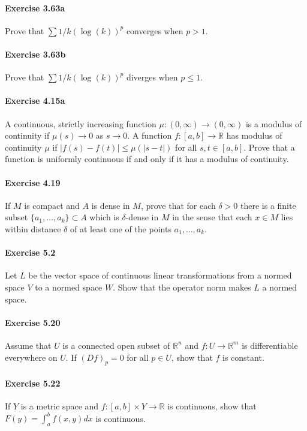 \documentclass{article}
\begin{document}
\paragraph{Exercise 3.63a} Prove that $\sum 1/k(\log(k))^p$ converges when $p > 1$.


\paragraph{Exercise 3.63b} Prove that $\sum 1/k(\log(k))^p$ diverges when $p \leq 1$.


\paragraph{Exercise 4.15a} A continuous, strictly increasing function $\mu \colon (0, \infty) \rightarrow (0, \infty)$ is a modulus of continuity if $\mu(s) \rightarrow 0$ as $s \rightarrow 0$. A function $f \colon [a, b] \rightarrow \mathbb{R}$ has modulus of continuity $\mu$ if $|f(s) - f(t)| \leq \mu(|s - t|)$ for all $s, t \in [a, b]$. Prove that a function is uniformly continuous if and only if it has a modulus of continuity.


\paragraph{Exercise 4.19} If $M$ is compact and $A$ is dense in $M$, prove that for each $\delta > 0$ there is a finite subset $\{a_1, \ldots , a_k\} \subset A$ which is $\delta$-dense in $M$ in the sense that each $x \in M$ lies within distance $\delta$ of at least one of the points $a_1,\ldots, a_k$.


\paragraph{Exercise 5.2} Let $L$ be the vector space of continuous linear transformations from a normed space $V$ to a normed space $W$. Show that the operator norm makes $L$ a normed space.


\paragraph{Exercise 5.20} Assume that $U$ is a connected open subset of $\mathbb{R}^n$ and $f \colon U \rightarrow \mathbb{R}^m$ is differentiable everywhere on $U$. If $(Df)_p = 0$ for all $p \in U$, show that $f$ is constant.


\paragraph{Exercise 5.22} If $Y$ is a metric space and $f \colon [a, b] \times Y \rightarrow \mathbb{R}$ is continuous, show that $F(y) = \int^b_a f(x,y) dx$ is continuous.
\end{document}
